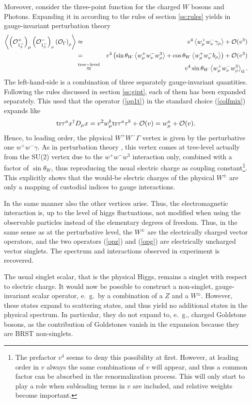 \documentclass[final,12pt]{article}
\newcommand*{\no}{\noindent}
\newcommand*{\bea}{\begin{eqnarray}}
\newcommand*{\eea}{\end{eqnarray}}
\newcommand*{\be}{\begin{equation}}
\newcommand*{\ee}{\end{equation}}
\newcommand*{\pref}[1]{(\ref{#1})}
\newcommand*{\nn}{\nonumber}
\newcommand*{\tr}{\mathrm{tr}}
\newcommand*{\1}{1\!\!\!\bot}
\newcommand*{\la}{\left\langle}
\newcommand*{\ra}{\right\rangle}
\newcommand*{\op}{{\cal O}}
\begin{document}
Moreover, consider the three-point function for the charged $W$ bosons and Photons. Expanding it in according to the rules of section \ref{ss:rules} yields in gauge-invariant perturbation theory
\bea
\la\left(\op_{1_3^-}^+\right)_\mu\left(\op_{1_3^-}^-\right)_\nu\left(\op_\Gamma\right)_\rho\ra&\approx& v^4\la w_\mu^+w_\nu^-\gamma_\rho\ra+\op(v^3)\label{electric}\\
&=&v^4\left(\sin\theta_W\la w_\mu^+w_\nu^-w^3_\rho\ra+\cos\theta_W\la w_\mu^+w_\nu^-b_\rho\ra\right)+\op(v^3)\nn\\
&\stackrel{\mathrm{tree-level}}{\approx}&v^4\sin\theta_W\la w_\mu^+w_\nu^-w^3_\rho\ra_{\mathrm{tl}}\nn.
\eea
\no The left-hand-side is a combination of three separately gauge-invariant quantities. Following the rules discussed in section \ref{ss:gipt}, each of them has been expanded separately. This used that the operator \pref{op1t} in the standard choice \pref{colfmix} expands like
\be
\tr\tau^a x^\dagger D_\mu x=v^2w_\mu^b\tr\tau^a\tau^b+\op(v)=w_\mu^a+\op(v)\nn.
\ee
\no Hence, to leading order, the physical $W^+W^-\Gamma$ vertex is given by the perturbative one $w^+w^-\gamma$. As in perturbation theory \cite{Bohm:2001yx}, this vertex comes at tree-level actually from the SU(2) vertex due to the $w^+w^-w^3$ interaction only, combined with a factor of $\sin\theta_W$, thus reproducing the usual electric charge as coupling constant\footnote{The prefactor $v^4$ seems to deny this possibility at first. However, at leading order in $v$ always the same combinations of $v$ will appear, and thus a common factor can be absorbed in the renormalization process. This will only start to play a role when subleading terms in $v$ are included, and relative weights become important.}. This explicitly shows that the would-be electric charges of the physical $W^\pm$ are only a mapping of custodial indices to gauge interactions.

In the same manner also the other vertices arise. Thus, the electromagnetic interaction is, up to the level of higgs fluctuations, not modified when using the observable particles instead of the elementary degrees of freedom. Thus, in the same sense as at the perturbative level, the $W^\pm$ are the electrically charged vector operators, and the two operators \pref{opz} and \pref{opg} are electrically uncharged vector singlets. The spectrum and interactions observed in experiment is recovered.

The usual singlet scalar, that is the physical Higgs, remains a singlet with respect to electric charge. It would now be possible to construct a non-singlet, gauge-invariant scalar operator, e.\ g.\ by a combination of a $Z$ and a $W^\pm$. However, these states expand to scattering states, and thus yield no additional states in the physical spectrum. In particular, they do not expand to, e.\ g., charged Goldstone bosons, as the contribution of Goldstones vanish in the expansion because they are BRST non-singlets.
\end{document}
